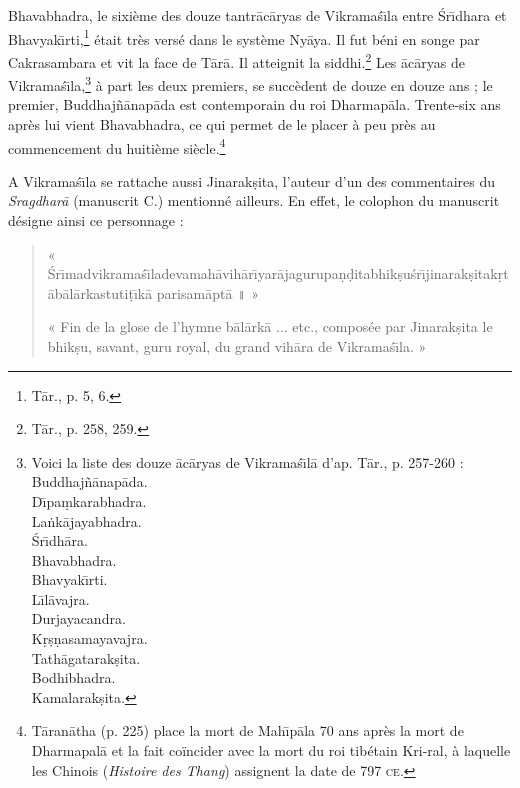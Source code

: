 \documentclass[a4paper, 11pt, oneside, french]{article}
\begin{document}
Bhavabhadra, le sixième des douze tantr\={a}c\={a}ryas de Vikrama\'{s}\={\i}la entre \'{S}r\={\i}dhara et Bhavyak\={\i}rti,\footnote{T\={a}r., p. 5, 6.} était très versé dans le système Ny\={a}ya. Il fut béni en songe par Cakrasambara et vit la face de T\={a}r\={a}. Il atteignit la siddhi.\footnote{T\={a}r., p. 258, 259.} Les \={a}c\={a}ryas de Vikrama\'{s}\={\i}la,\footnote{Voici la liste des douze \={a}c\={a}ryas de Vikrama\'{s}\={\i}l\={a} d'ap. T\={a}r., p. 257-260 :\\\hspace*{10mm}Buddhaj\~{n}\={a}nap\={a}da.\\\hspace*{10mm}D\={\i}pa\d{m}karabhadra.\\\hspace*{10mm}La\.{n}k\={a}jayabhadra.\\\hspace*{10mm}\'{S}r\={\i}dh\={a}ra.\\\hspace*{10mm}Bhavabhadra.\\\hspace*{10mm}Bhavyak\={\i}rti.\\\hspace*{10mm}L\={\i}l\={a}vajra.\\\hspace*{10mm}Durjayacandra.\\\hspace*{10mm}K\d{r}\d{s}\d{n}asamayavajra.\\\hspace*{10mm}Tath\={a}gatarak\d{s}ita.\\\hspace*{10mm}Bodhibhadra.\\\hspace*{10mm}Kamalarak\d{s}ita.} à part les deux premiers, se succèdent de douze en douze ans ; le premier, Buddhaj\~{n}\={a}nap\={a}da est contemporain du roi Dharmap\={a}la. Trente-six ans après lui vient Bhavabhadra, ce qui permet de le placer à peu près au commencement du huitième siècle.\footnote{T\={a}ran\={a}tha (p. 225) place la mort de Mah\={\i}p\={a}la 70 ans après la mort de Dharmapal\={a} et la fait coïncider avec la mort du roi tibétain Kri-ral, à laquelle les Chinois (\emph{Histoire des Thang}) assignent la date de 797 \textsc{ce}.}

A Vikrama\'{s}\={\i}la se rattache aussi Jinarak\d{s}ita, l'auteur d'un des commentaires du \emph{Sragdhar\={a}} (manuscrit C.) mentionné ailleurs. En effet, le colophon du manuscrit désigne ainsi ce personnage :
\begin{quotation}
« \'{S}r\={\i}madvikrama\'{s}\={\i}ladevamah\={a}vih\={a}r\={\i}yar\={a}jagurupa\d{n}\d{d}itabhik\d{s}u\'{s}r\={\i}jinarak\d{s}itak\d{r}t\={a}b\={a}l\={a}rkastuti\d{t}\={\i}k\={a} parisam\={a}pt\={a} \texthindi{॥} »

\bigskip

« Fin de la glose de l'hymne b\={a}l\={a}rk\={a} ... etc., composée par Jinarak\d{s}ita le bhik\d{s}u, savant, guru royal, du grand vih\={a}ra de Vikrama\'{s}\={\i}la. »
\end{quotation}
\end{document}
